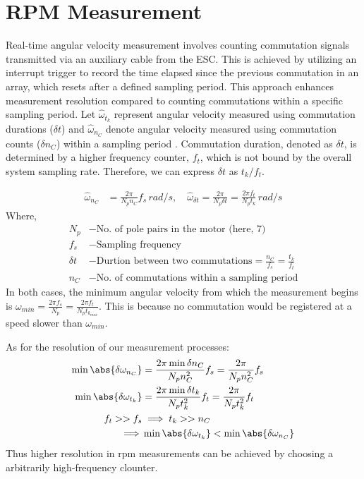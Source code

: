 \section{RPM Measurement}
Real-time angular velocity measurement involves counting commutation signals
transmitted via an auxiliary cable from the ESC. This is achieved by utilizing
an interrupt trigger to record the time elapsed since the previous commutation
in an array, which resets after a defined sampling period. This approach
enhances measurement resolution compared to counting commutations within a
specific sampling period. Let $\hat \omega_{t_k}$ represent angular velocity
measured using commutation durations ($\delta t$) and $\hat \omega_{n_C}$
denote angular velocity measured using commutation counts ($\delta n_C$) within
a sampling period \cite{PX4-autopilot-rpm}. Commutation duration, denoted as
$\delta t$, is determined by a higher frequency counter, $f_t$, which is not
bound by the overall system sampling rate. Therefore, we can express $\delta t$
as $t_k / f_t$.

\begin{align}
    \hat \omega_{n_C} &= \frac{2 \pi}{N_p n_C} f_s \, rad/s, \quad
    \hat \omega_{\delta t} = \frac{2 \pi}{N_p  \delta t}  = \frac{2 \pi f_t}{N_p t_k} \, rad/s
\end{align}
Where,
\begin{align*}
    N_p &- \text{No. of pole pairs in the motor (here, 7)}\\
    f_s &- \text{Sampling frequency}\\
    \delta t &- \text{Durtion between two commutations} = \frac{n_C}{f_s} = \frac{t_k}{f_t}\\
    n_C &- \text{No. of commutations within a sampling period}
\end{align*}
In both cases, the minimum angular velocity from which the measurement begins is $\omega_{min} = \frac{2 \pi f_s}{N_p} = \frac{2 \pi f_t}{N_p t_{k_{max}}}$. This is because no commutation would be registered at a speed slower than $\omega_{min}$.

As for the resolution of our measurement processes:
\begin{align}
    \min{\abs{\delta \omega_{n_C}}} &= \frac{2 \pi \min{\delta n_C}}{N_p n_C^2} f_s = \frac{2 \pi }{N_p n_C^2} f_s \\
    \min{\abs{\delta \omega_{t_k}}} &= \frac{2 \pi \min{\delta t_k}}{N_p t_k^2} f_t = \frac{2 \pi}{N_p t_k^2} f_t\\
    f_t >> f_s & \implies  t_k >> n_C \\
    \implies & \min{\abs{\delta \omega_{t_k}}} < \min{\abs{\delta \omega_{n_C}}}
\end{align}
Thus higher resolution in rpm measurements can be achieved by choosing a arbitrarily high-frequency clounter.


